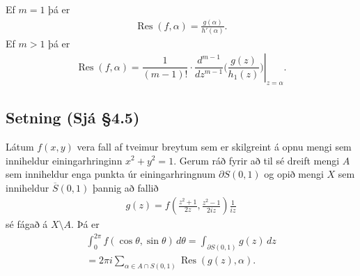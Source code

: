 \documentclass[a4paper,10pt,icelandic]{sphinxmanual}
\begin{document}
Ef \(m=1\) þá er
\begin{equation*}
\begin{split}\operatorname{Res}(f,\alpha)=\frac{g(\alpha)}{h'(\alpha)}.\end{split}
\end{equation*}
Ef \(m>1\) þá er
\begin{equation*}
\begin{split}\operatorname{Res}(f,\alpha)=\dfrac 1{(m-1)!}\cdot
\left.\dfrac {d^{m-1}}{dz^{m-1}}\bigg(\dfrac
{g(z)}{h_1(z)}\bigg)\right|_{z=\alpha}. \label{11.1.7}\end{split}
\end{equation*}

\subsection{Setning (Sjá \S{}4.5)}
\label{\detokenize{Kafli04:setning-sja-4-5}}
Látum \(f(x,y)\) vera fall af tveimur breytum sem er skilgreint á opnu mengi sem inniheldur einingarhringinn \(x^2+y^2=1\). Gerum ráð fyrir að til sé dreift mengi \(A\) sem inniheldur enga punkta úr einingarhringnum \(\partial S(0,1)\) og opið mengi \(X\) sem inniheldur \(\overline{S}(0,1)\) þannig að fallið
\begin{equation*}
\begin{split}g(z)=f\left(\frac{z^2+1}{2z}, \frac{z^2-1}{2iz}\right)\frac{1}{iz}\end{split}
\end{equation*}
sé fágað á \(X\setminus A\). Þá er
\begin{equation*}
\begin{split}\int_0^{2\pi}f(\cos\theta, \sin\theta)\,d\theta
=\int_{\partial S(0,1)}g(z)\,dz\\
= 2\pi i\sum_{\alpha\in A\cap S(0,1)}\operatorname{Res}(g(z),\alpha).\end{split}
\end{equation*}
\end{document}
